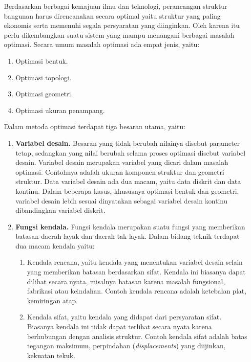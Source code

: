 Berdasarkan berbagai kemajuan ilmu dan teknologi, perancangan struktur
bangunan harus direncanakan secara optimal yaitu struktur yang paling
ekonomis serta memenuhi segala persyaratan yang diinginkan. Oleh karena
itu perlu dikembangkan suatu sistem yang mampu menangani berbagai masalah
optimasi. Secara umum masalah optimasi ada empat jenis, yaitu:
\begin{enumerate}[label=\arabic*.]
\item Optimasi bentuk.
\item Optimasi topologi.
\item Optimasi geometri.
\item Optimasi ukuran penampang.
\end{enumerate}

Dalam metoda optimasi terdapat tiga besaran utama, yaitu:
\begin{enumerate}[label=\arabic*.]
\item \textbf{Variabel desain.} Besaran yang tidak berubah nilainya
      disebut parameter tetap, sedangkan yang nilai berubah selama proses
      optimasi disebut variabel desain. Variabel desain merupakan
      variabel yang dicari dalam masalah optimasi. Contohnya adalah
      ukuran komponen struktur dan geometri struktur. Data variabel
      desain ada dua macam, yaitu data diskrit dan data kontinu. Dalam
      beberapa kasus, khususnya optimasi bentuk dan geometri, variabel
      desain lebih sesuai dinyatakan sebagai variabel desain kontinu
      dibandingkan variabel diskrit.
\item \textbf{Fungsi kendala.} Fungsi kendala merupakan suatu fungsi yang
      memberikan batasan daerah layak dan daerah tak layak. Dalam bidang
      teknik terdapat dua macam kendala yaitu:
      \begin{enumerate}[label=\alph*.]
      \item Kendala rencana, yaitu kendala yang menentukan variabel
            desain selain yang memberikan batasan berdasarkan sifat.
            Kendala ini biasanya dapat dilihat secara nyata, misalnya
            batasan karena masalah fungsional, fabrikasi atau keindahan.
            Contoh kendala rencana adalah ketebalan plat, kemiringan
            atap.
      \item Kendala sifat, yaitu kendala yang didapat dari persyaratan
            sifat. Biasanya kendala ini tidak dapat terlihat secara nyata
            karena berhubungan dengan analisis struktur. Contoh kendala
            sifat adalah batas tegangan maksimum, perpindahan
            (\textit{displacements}) yang diijinkan, kekuatan tekuk.

\end{enumerate}
\end{enumerate}
